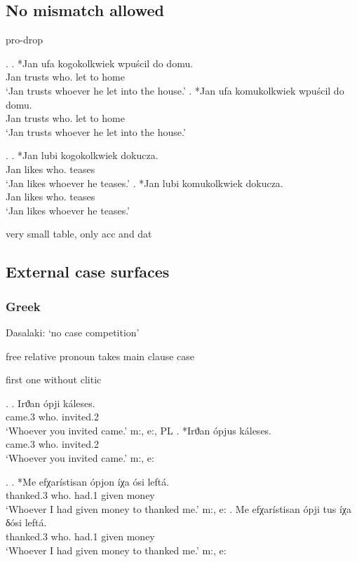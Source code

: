 \subsection{No mismatch allowed}

pro-drop

\ex.
\ag. *Jan ufa kogokolkwiek wpu{\'s}cil do domu.\\
Jan trusts who. let to home\\
`Jan trusts whoever he let into the house.'
\bg. *Jan ufa komukolkwiek wpu{\'s}cil do domu.\\
Jan trusts who. let to home\\
`Jan trusts whoever he let into the house.'

\ex.
\ag. *Jan lubi kogokolkwiek dokucza.\\
Jan likes who. teases\\
`Jan likes whoever he teases.'
\bg. *Jan lubi komukolkwiek dokucza.\\
Jan likes who. teases\\
`Jan likes whoever he teases.'

very small table, only acc and dat

\subsection{External case surfaces}


\subsubsection{Greek}

Dasalaki: `no case competition'

free relative pronoun takes main clause case

first one without clitic

\ex.
\ag. Irϑan ópji káleses.\\
came.3 who. invited.2\\
`Whoever you invited came.' \hfill m:, e:, PL
\bg. *Irϑan ópjus káleses.\\
came.3 who. invited.2\\
`Whoever you invited came.' \hfill m:, e:

\ex.
\ag. *Me efχarístisan ópjon íχa ósi leftá.\\
 thanked.3 who. had.1 given money\\
`Whoever I had given money to thanked me.' \hfill m:, e:
\bg. Me efχarístisan ópji tus íχa δósi leftá.\\
 thanked.3 who.  had.1 given money\\
`Whoever I had given money to thanked me.' \hfill m:, e:

